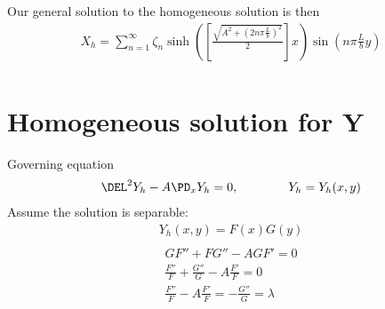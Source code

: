\documentclass[11pt]{article}
\begin{document}
Our general solution to the homogeneous solution is then
\begin{equation}\begin{aligned}
X_h = \sum_{n=1}^{\infty} \zeta_n \sinh \left( \left[\frac{\sqrt{A^2 + \left(2 n \pi \frac{L}{b} \right)^2}}{2}\right] x \right) \sin \left(n \pi \frac{L}{b} y \right) \\
\end{aligned} \end{equation}

\section{Homogeneous solution for Y}
Governing equation
\begin{equation}\begin{aligned}
\DEL^2 Y_h - A \PD_x Y_h = 0, \qquad\qquad Y_h = Y_h(x,y) \\
\end{aligned} \end{equation}
Assume the solution is separable:
\begin{equation}\begin{aligned}
Y_h(x,y) = F(x)G(y) \\
\end{aligned} \end{equation}
\begin{equation}\begin{aligned}
G F'' + FG'' - A G F' = 0 \\
 \frac{F''}{F} + \frac{G''}{G} - A \frac{F'}{F} = 0 \\
 \frac{F''}{F} - A \frac{F'}{F} = - \frac{G''}{G} = \lambda \\
\end{aligned} \end{equation}
\end{document}
